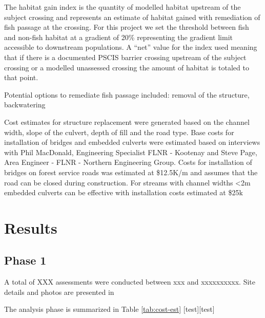 \documentclass[
]{book}
\begin{document}
The habitat gain index is the quantity of modelled habitat upstream of the subject crossing and represents an estimate of habitat gained with remediation of fish passage at the crossing. For this project we set the threshold between fish and non-fish habitat at a gradient of 20\% representing the gradient limit accessible to downstream populations. A ``net'' value for the index used meaning that if there is a documented PSCIS barrier crossing upstream of the subject crossing or a modelled unassessed crossing the amount of habitat is totaled to that point.

Potential options to remediate fish passage included: removal of the structure, backwatering

Cost estimates for structure replacement were generated based on the channel width, slope of the culvert, depth of fill and the road type. Base costs for installation of bridges and embedded culverts were estimated based on interviews with Phil MacDonald, Engineering Specialist FLNR - Kootenay and Steve Page, Area Engineer - FLNR - Northern Engineering Group. Costs for installation of bridges on forest service roads was estimated at \$12.5K/m and assumes that the road can be closed during construction. For streams with channel widths \textless2m embedded culverts can be effective with installation costs estimated at \$25k

\hypertarget{results}{%
\chapter{Results}\label{results}}

\hypertarget{phase-1}{%
\section{Phase 1}\label{phase-1}}

A total of XXX assessments were conducted between xxx and xxxxxxxxxx. Site details and photos are presented in

The analysis phase is summarized in Table \ref{tab:cost-est} {[}test{]}{[}test{]}
\end{document}
